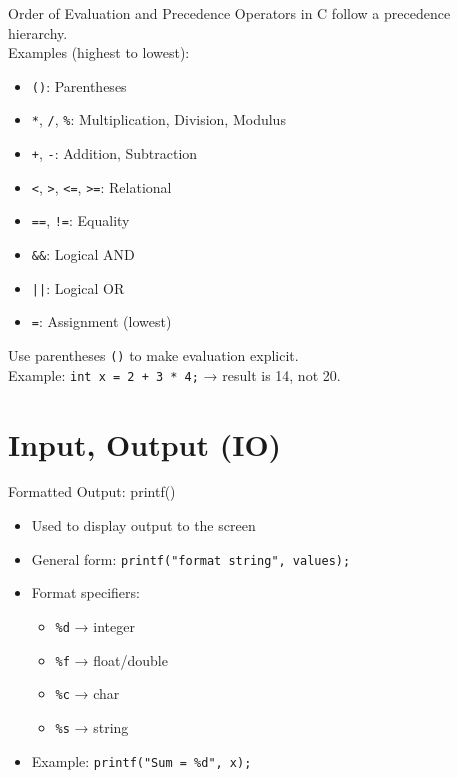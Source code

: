 \documentclass[12pt, aspectratio=169]{beamer}
\begin{document}
    \begin{frame}{Order of Evaluation and Precedence}
        Operators in C follow a precedence hierarchy.\\

        Examples (highest to lowest):
            \begin{itemize}
                \item \texttt{()}: Parentheses
                \item \texttt{*}, \texttt{/}, \texttt{\%}: Multiplication, Division, Modulus
                \item \texttt{+}, \texttt{-}: Addition, Subtraction
                \item \texttt{<}, \texttt{>}, \texttt{<=}, \texttt{>=}: Relational
                \item \texttt{==}, \texttt{!=}: Equality
                \item \texttt{\&\&}: Logical AND
                \item \texttt{||}: Logical OR
                \item \texttt{=}: Assignment (lowest)
            \end{itemize}
        Use parentheses \texttt{()} to make evaluation explicit.\\

        Example: \texttt{int x = 2 + 3 * 4;} → result is 14, not 20.
    \end{frame}


    \section{Input, Output (IO)}

    \begin{frame}{Formatted Output: printf()}
        \begin{itemize}
            \item Used to display output to the screen
            \item General form: \texttt{printf("format string", values);}
            \item Format specifiers:
                \begin{itemize}
                    \item \texttt{\%d} → integer
                    \item \texttt{\%f} → float/double
                    \item \texttt{\%c} → char
                    \item \texttt{\%s} → string
                \end{itemize}
            \item Example: \texttt{printf("Sum = \%d", x);}
        \end{itemize}
    \end{frame}
\end{document}
